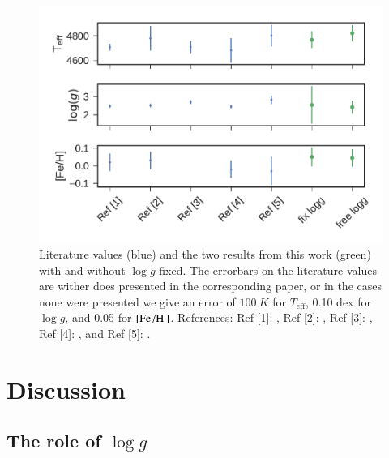 \documentclass{aa}
\begin{document}
\begin{figure}[htpb!!]
    \centering
    \includegraphics[width=1.0\linewidth]{figures/10LeoParams.pdf}
    \caption{Literature values (blue) and the two results from this work (green)
             with and without $\log g$ fixed. The errorbars on the literature
             values are wither does presented in the corresponding paper, or in
             the cases none were presented we give an error of $\SI{100}{K}$ for
             $T_\mathrm{eff}$, 0.10 dex for $\log g$, and 0.05 for
             $[\ion{Fe}/\ion{H}]$.
             References:
             Ref [1]: \citet{Luck2015},
             Ref [2]: \citet{Park2013},
             Ref [3]: \citet{Massarotti2008},
             Ref [4]: \citet{Soubiran2008}, and
             Ref [5]: \cite{daSilva2011}.}
    \label{fig:10leo}
\end{figure}



\section{Discussion}
\label{sec:discussion}

\subsection{The role of $\log g$}
\end{document}
